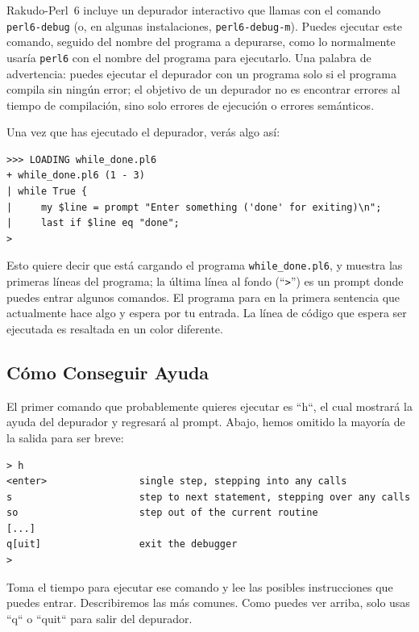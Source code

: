 Rakudo-Perl~6 incluye un depurador interactivo que 
llamas con el comando {\tt perl6-debug} (o, en algunas
instalaciones, {\tt perl6-debug-m}). Puedes ejecutar este 
comando, seguido del nombre del programa a depurarse, como
lo normalmente usaría {\tt perl6} con el nombre del programa
para ejecutarlo. Una palabra de advertencia: puedes ejecutar
el depurador con un programa solo si el programa
compila sin ningún error; el objetivo de un depurador no es encontrar 
errores al tiempo de compilación, sino solo errores de
ejecución o errores semánticos.

Una vez que has ejecutado el depurador, verás algo así:

\begin{lstlisting}
>>> LOADING while_done.pl6
+ while_done.pl6 (1 - 3)
| while True {
|     my $line = prompt "Enter something ('done' for exiting)\n";
|     last if $line eq "done";
>
\end{lstlisting}

Esto quiere decir que está cargando el programa \verb|while_done.pl6|,
y muestra las primeras líneas del programa; la última línea al fondo
(``\verb">"'')  es un prompt donde puedes entrar algunos comandos.
El programa para en la primera sentencia que actualmente hace algo y espera
por tu entrada. La línea de código que espera ser ejecutada
es resaltada en un color diferente.

\subsection{Cómo Conseguir Ayuda}

El primer comando que probablemente quieres ejecutar es ``h``,
el cual mostrará la ayuda del depurador y regresará al 
prompt. Abajo, hemos omitido la mayoría de la salida
para ser breve:

\begin{lstlisting}
> h
<enter>                single step, stepping into any calls
s                      step to next statement, stepping over any calls
so                     step out of the current routine
[...]
q[uit]                 exit the debugger
>
\end{lstlisting}

Toma el tiempo para ejecutar ese comando y lee 
las posibles instrucciones que puedes entrar.
Describiremos las más comunes. Como puedes ver arriba,
solo usas ``q`` o ``quit`` para salir del depurador.

